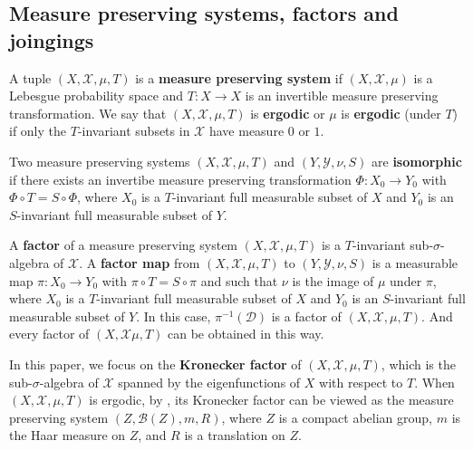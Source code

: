 \documentclass[reqno,12pt]{amsart}
\def\B {\mathcal B}
\def \X {\mathcal{X}}
\def \Y {\mathcal{Y}}
\numberwithin{equation}{section}
\begin{document}
\subsection{Measure preserving systems, factors and joingings}
A tuple $(X,\X,\mu,T)$ is a \textbf{measure preserving system} if $(X,\X,\mu)$ is a Lebesgue probability space and $T:X\to X$ is an invertible measure preserving transformation. We say that $(X,\X,\mu,T)$ is \textbf{ergodic} or $\mu$ is \textbf{ergodic} (under $T$) if only the $T$-invariant subsets in $\X$ have measure $0$ or $1$.

Two measure preserving systems $(X,\X,\mu,T)$ and $(Y,\Y,\nu,S)$ are \textbf{isomorphic} if there exists an invertibe measure preserving transformation $\Phi:X_0\to Y_0$ with $\Phi \circ T=S\circ\Phi$, where $X_0$ is a $T$-invariant full measurable subset of $X$ and $Y_0$ is an $S$-invariant full measurable subset of $Y$.

A \textbf{factor} of a measure preserving system $(X,\X,\mu,T)$ is a $T$-invariant sub-$\sigma$-algebra of $\X$. A \textbf{factor map} from $(X,\X,\mu,T)$ to $(Y,\Y,\nu,S)$ is a measurable map $\pi:X_{0}\rightarrow Y_{0}$ with $\pi\circ T=S\circ\pi$ and such that $\nu$ is the image of $\mu$ under $\pi$, where $X_0$ is a $T$-invariant full measurable subset of $X$ and $Y_0$ is an $S$-invariant full measurable subset of $Y$. In this case, $\pi^{-1}(\mathcal{D})$ is a factor of $(X,\X,\mu,T)$. And every factor of $(X,\X\mu,T)$ can be obtained in this way.

In this paper, we focus on the \textbf{Kronecker factor} of $(X,\X,\mu,T)$, which is the sub-$\sigma$-algebra of $\X$ spanned by the eigenfunctions of $X$ with respect to $T$. When $(X,\X,\mu,T)$ is ergodic, by \cite[Proposition 4.13.(iv)]{HK}, its Kronecker factor can be viewed as the measure preserving system $(Z,\B(Z),m,R)$, where $Z$ is a compact abelian group, $m$ is the Haar measure on $Z$, and $R$ is a translation on $Z$.
\end{document}
